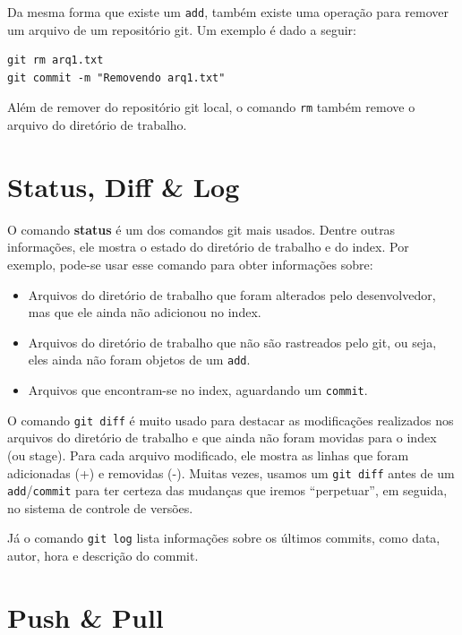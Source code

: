 \documentclass[
  11pt,
  twoside]{book}
\newcommand{\passthrough}[1]{#1}
\begin{document}
Da mesma forma que existe um \passthrough{\lstinline!add!}, também
existe uma operação para remover um arquivo de um repositório git. Um
exemplo é dado a seguir:

\begin{lstlisting}
git rm arq1.txt
git commit -m "Removendo arq1.txt"
\end{lstlisting}

Além de remover do repositório git local, o comando
\passthrough{\lstinline!rm!} também remove o arquivo do diretório de
trabalho.

\hypertarget{status-diff-log}{%
\section{Status, Diff \& Log}\label{status-diff-log}}

 O comando \textbf{status} é um dos comandos git mais
usados. Dentre outras informações, ele mostra o estado do diretório de
trabalho e do index. Por exemplo, pode-se usar esse comando para obter
informações sobre:

\begin{itemize}
\item
  Arquivos do diretório de trabalho que foram alterados pelo
  desenvolvedor, mas que ele ainda não adicionou no index.
\item
  Arquivos do diretório de trabalho que não são rastreados pelo git, ou
  seja, eles ainda não foram objetos de um
  \passthrough{\lstinline!add!}.
\item
  Arquivos que encontram-se no index, aguardando um
  \passthrough{\lstinline!commit!}.
\end{itemize}

O comando \passthrough{\lstinline!git diff!}  é muito
usado para destacar as modificações realizados nos arquivos do diretório
de trabalho e que ainda não foram movidas para o index (ou stage). Para
cada arquivo modificado, ele mostra as linhas que foram adicionadas (+)
e removidas (-). Muitas vezes, usamos um
\passthrough{\lstinline!git diff!} antes de um
\passthrough{\lstinline!add!}/\passthrough{\lstinline!commit!} para ter
certeza das mudanças que iremos ``perpetuar'', em seguida, no sistema de
controle de versões.

 Já o comando \passthrough{\lstinline!git log!} lista
informações sobre os últimos commits, como data, autor, hora e descrição
do commit.

\hypertarget{push-pull}{%
\section{Push \& Pull}\label{push-pull}}
\end{document}

